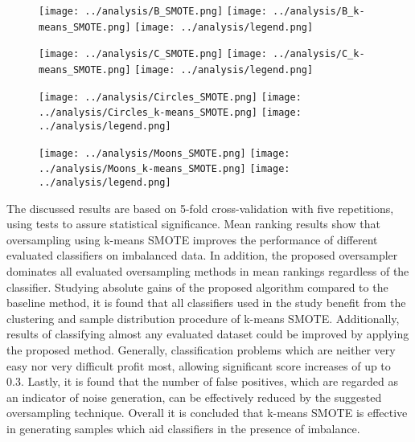 \documentclass[sort&compress]{elsarticle}
\begin{document}
 \begin{figure}[ht]
	\centering
	\texttt{[image: ../analysis/B\_SMOTE.png]}
	\hfill
	\texttt{[image: ../analysis/B\_k-means\_SMOTE.png]}
	\texttt{[image: ../analysis/legend.png]}
	\label{fig:toy-b}
 \end{figure}

 \begin{figure}[ht]
	\centering
	\texttt{[image: ../analysis/C\_SMOTE.png]}
	\hfill
	\texttt{[image: ../analysis/C\_k-means\_SMOTE.png]}
	\texttt{[image: ../analysis/legend.png]}
	\label{fig:toy-c}
 \end{figure}

  \begin{figure}[ht]
	\centering
	\texttt{[image: ../analysis/Circles\_SMOTE.png]}
	\hfill
	\texttt{[image: ../analysis/Circles\_k-means\_SMOTE.png]}
	\texttt{[image: ../analysis/legend.png]}
	\label{fig:toy-circles}
 \end{figure}

 \begin{figure}[ht]
	\centering
	\texttt{[image: ../analysis/Moons\_SMOTE.png]}
	\hfill
	\texttt{[image: ../analysis/Moons\_k-means\_SMOTE.png]}
	\texttt{[image: ../analysis/legend.png]}
	\label{fig:toy-moons}
 \end{figure}

The discussed results are based on 5-fold cross-validation with five
repetitions, using tests to assure statistical significance. Mean ranking
results show that oversampling using k-means \ac{SMOTE} improves the performance
of different evaluated classifiers on imbalanced data. In addition, the proposed
oversampler dominates all evaluated oversampling methods in mean rankings
regardless of the classifier. Studying absolute gains of the proposed algorithm
compared to the baseline method, it is found that all classifiers used in the
study benefit from the clustering and sample distribution procedure of k-means
\ac{SMOTE}. Additionally, results of classifying almost any evaluated dataset
could be improved by applying the proposed method. Generally, classification
problems which are neither very easy nor very difficult profit most, allowing
significant score increases of up to 0.3. Lastly, it is found that the number of
false positives, which are regarded as an indicator of noise generation, can be
effectively reduced by the suggested oversampling technique. Overall it is
concluded that k-means \ac{SMOTE} is effective in generating samples which aid
classifiers in the presence of imbalance.
\end{document}
